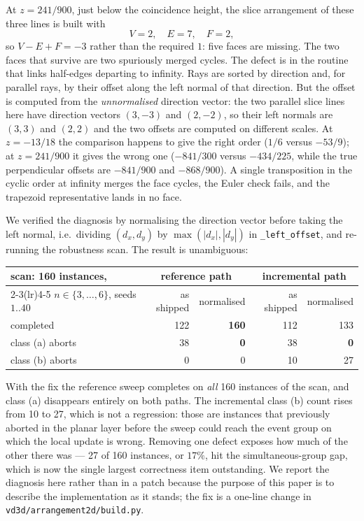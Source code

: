 \documentclass[11pt]{article}
\begin{document}
At $z = 241/900$, just below the coincidence height, the slice arrangement of
these three lines is built with
\[
  V = 2,\quad E = 7,\quad F = 2,
\]
so $V - E + F = -3$ rather than the required $1$: five faces are missing.  The
two faces that survive are two spuriously merged cycles.  The defect is in the
routine that links half-edges departing to infinity.  Rays are sorted by
direction and, for parallel rays, by their offset along the left normal of that
direction.  But the offset is computed from the \emph{unnormalised} direction
vector: the two parallel slice lines here have direction vectors $(3,-3)$ and
$(2,-2)$, so their left normals are $(3,3)$ and $(2,2)$ and the two offsets are
computed on different scales.  At $z = -13/18$ the comparison happens to give
the right order ($1/6$ versus $-53/9$); at $z = 241/900$ it gives the wrong one
($-841/300$ versus $-434/225$, while the true perpendicular offsets are
$-841/900$ and $-868/900$).  A single transposition in the cyclic order at
infinity merges the face cycles, the Euler check fails, and the trapezoid
representative lands in no face.

We verified the diagnosis by normalising the direction vector before taking the
left normal, i.e.\ dividing $(d_x,d_y)$ by $\max(|d_x|,|d_y|)$ in
\verb|_left_offset|, and re-running the robustness scan.  The result is
unambiguous:

\begin{center}
\begin{tabular}{lrrrr}
\toprule
scan: 160 instances, & \multicolumn{2}{c}{reference path} & \multicolumn{2}{c}{incremental path} \\
\cmidrule(lr){2-3}\cmidrule(lr){4-5}
$n \in \{3,\dots,6\}$, seeds $1..40$ & as shipped & normalised & as shipped & normalised \\
\midrule
completed          & 122 & \textbf{160} & 112 & 133 \\
class (a) aborts   & 38  & \textbf{0}   & 38  & \textbf{0} \\
class (b) aborts   & 0   & 0            & 10  & 27 \\
\bottomrule
\end{tabular}
\end{center}

With the fix the reference sweep completes on \emph{all} 160 instances of the
scan, and class (a) disappears entirely on both paths.  The incremental class
(b) count rises from 10 to 27, which is not a regression: those are instances
that previously aborted in the planar layer before the sweep could reach the
event group on which the local update is wrong.  Removing one defect exposes
how much of the other there was --- 27 of 160 instances, or $17\%$, hit the
simultaneous-group gap, which is now the single largest correctness item
outstanding.
We report the diagnosis here rather than in a patch because the purpose of this
paper is to describe the implementation as it stands; the fix is a one-line
change in \texttt{vd3d/arrangement2d/build.py}.
\end{document}
